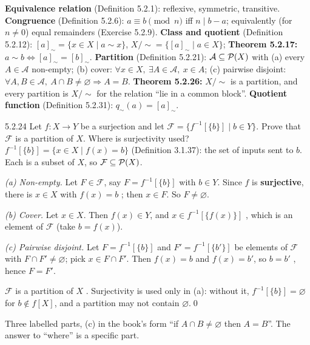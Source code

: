 
\begin{key}
\textbf{Equivalence relation} (Definition 5.2.1): reflexive, symmetric, transitive. \textbf{Congruence} (Definition 5.2.6): $a\equiv b\pmod n$ iff $n\mid b-a$; equivalently (for $n\ne0$) equal remainders (Exercise 5.2.9). \textbf{Class and quotient} (Definition 5.2.12): $[a]_\sim=\{x\in X\mid a\sim x\}$, $X/{\sim}=\{[a]_\sim\mid a\in X\}$; \textbf{Theorem 5.2.17:} $a\sim b\Leftrightarrow[a]_\sim=[b]_\sim$. \textbf{Partition} (Definition 5.2.21): $\mathcal A\subseteq\mathcal{P}(X)$ with (a) every $A\in\mathcal A$ non-empty; (b) cover: $\forall x\in X,\ \exists A\in\mathcal A,\ x\in A$; (c) pairwise disjoint: $\forall A,B\in\mathcal A,\ A\cap B\ne\varnothing\Rightarrow A=B$. \textbf{Theorem 5.2.26:} $X/{\sim}$ is a partition, and every partition is $X/{\sim}$ for the relation ``lie in a common block''. \textbf{Quotient function} (Definition 5.2.31): $q_\sim(a)=[a]_\sim$.
\end{key}

\begin{bookex}[essential]{5.2.24}
Let $f:X\to Y$ be a surjection and let $\mathcal F=\{f^{-1}[\{b\}]\mid b\in Y\}$. Prove that $\mathcal F$ is a partition of $X$. Where is surjectivity used?
\solution
\given $f^{-1}[\{b\}]=\{x\in X\mid f(x)=b\}$ (Definition 3.1.37): the set of inputs sent to $b$. Each is a subset of $X$, so $\mathcal F\subseteq\mathcal{P}(X)$.
\begin{steps}
\item \emph{(a) Non-empty.} Let $F\in\mathcal F$, say $F=f^{-1}[\{b\}]$ with $b\in Y$. Since $f$ is \textbf{surjective}, there is $x\in X$ with $f(x)=b$ ; then $x\in F$. So $F\ne\varnothing$.
\item \emph{(b) Cover.} Let $x\in X$. Then $f(x)\in Y$, and $x\in f^{-1}[\{f(x)\}]$ , which is an element of $\mathcal F$ (take $b=f(x)$).
\item \emph{(c) Pairwise disjoint.} Let $F=f^{-1}[\{b\}]$ and $F'=f^{-1}[\{b'\}]$ be elements of $\mathcal F$ with $F\cap F'\ne\varnothing$; pick $x\in F\cap F'$. Then $f(x)=b$ and $f(x)=b'$, so $b=b'$ , hence $F=F'$.
\end{steps}
\conclusion $\mathcal F$ is a partition of $X$ . Surjectivity is used only in (a): without it, $f^{-1}[\{b\}]=\varnothing$ for $b\notin f[X]$, and a partition may not contain $\varnothing$.\qed
\begin{compare}
\item Three labelled parts, (c) in the book's form ``if $A\cap B\ne\varnothing$ then $A=B$''. The answer to ``where'' is a specific part.
\end{compare}
\end{bookex}

